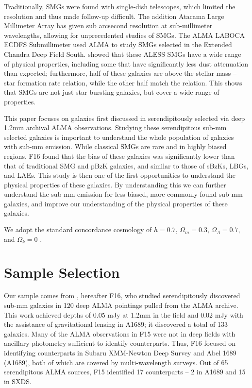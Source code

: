 \documentclass[preprint,natbib209]{aastex}
\begin{document}
Traditionally, SMGs were found with single-dish telescopes, which limited the resolution and thus made follow-up difficult. The addition Atacama Large Millimeter Array has given sub arcsecond resolution at sub-millimeter wavelengths, allowing for unprecedented studies of SMGs. The ALMA LABOCA ECDFS Submillimeter \citep[ALESS;][]{hodge13} used ALMA to study SMGs selected in the Extended Chandra Deep Field South. \cite{dacunha15} showed that these ALESS SMGs have a wide range of physical properties, including some that have significantly less dust attenuation than expected; furthermore, half of these galaxies are above the stellar mass -- star formation rate relation, while the other half match the relation. This shows that SMGs are not just star-bursting galaxies, but cover a wide range of properties.

This paper focuses on galaxies first discussed in \cite{fujimoto16} serendipitously selected via deep 1.2mm archival ALMA observations. 
Studying these serendipitous sub-mm selected galaxies is important to understand the whole population of galaxies with sub-mm emission.
While classical SMGs are rare and in highly biased regions, F16 found that the bias of these galaxies was significantly lower than that of traditional SMG and pBzK galaxies, and similar to those of sBzKs, LBGs, and LAEs. This study is then one of the first opportunities to understand the physical properties of these galaxies. By understanding this we can further understand the sub-mm emission for less biased, more commonly found sub-mm galaxies, and improve our understanding of the physical properties of these galaxies.

We adopt the standard concordance cosmology of $h = 0.7$, $\Omega_m = 0.3$, $\Omega_\Lambda = 0.7$, 
and $\Omega_k = 0$ \citep{planck13}.

\section{Sample Selection} 
\label{sec:sample}

Our sample comes from \citet{fujimoto16}, hereafter F16, who studied serendipitously discovered sub-mm galaxies in 
120 deep ALMA pointings pulled from the ALMA archive. This work achieved depths of 0.05 mJy at 1.2mm in the field and 0.02 mJy 
with the assistance of gravitational lensing in A1689; it discovered a total of 133 galaxies. Many of the ALMA observations in F15 were not
in deep fields with ancillary photometry sufficient to identify counterparts. Thus, F16 focused on identifying counterparts in Subaru XMM-Newton Deep 
Survey \citep[SXDS;][]{furusawa08} and Abel 1689 (A1689), both of which are covered by multi-wavelength surveys. 
Out of 65 serendipitous ALMA sources, F15 identified 17 counterparts -- 2 in A1689 and 15 in SXDS. 
\end{document}
